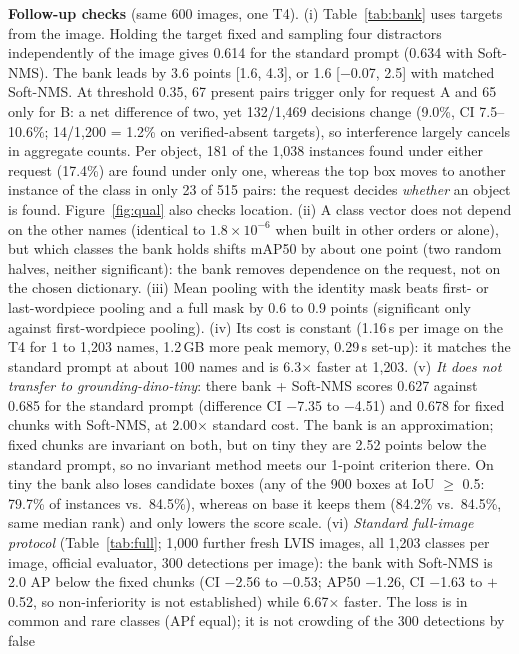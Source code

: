 \documentclass[10pt,twocolumn,letterpaper]{article}
\begin{document}
\textbf{Follow-up checks} (same 600 images, one T4).
(i) Table~\ref{tab:bank} uses targets from the image. Holding the target fixed and sampling four distractors
independently of the image gives 0.614 for the standard prompt (0.634 with Soft-NMS). The bank leads by 3.6 points
[1.6, 4.3], or 1.6 [$-$0.07, 2.5] with matched Soft-NMS. At threshold 0.35, 67 present pairs trigger only for request A
and 65 only for B: a net difference of two, yet 132/1{,}469 decisions change (9.0\%, CI 7.5--10.6\%; 14/1{,}200 = 1.2\%
on verified-absent targets), so interference largely cancels in aggregate counts. Per object, 181 of the 1{,}038
instances found under either request (17.4\%) are found under only one, whereas the top box moves to another instance of
the class in only 23 of 515 pairs: the request decides \emph{whether} an object is found. Figure~\ref{fig:qual} also checks
location. (ii) A class vector does not depend on the other names (identical to $1.8{\times}10^{-6}$ when built in other orders
or alone), but which classes the bank holds shifts mAP50 by about one point (two random halves, neither significant):
the bank removes dependence on the request, not on the chosen dictionary. (iii) Mean pooling with the identity mask
beats first- or last-wordpiece pooling and a full mask by 0.6 to 0.9 points (significant only against first-wordpiece pooling). (iv) Its cost is constant (1.16\,s per
image on the T4 for 1 to 1{,}203 names, 1.2\,GB more peak memory, 0.29\,s set-up): it matches the standard prompt at
about 100 names and is 6.3$\times$ faster at 1{,}203. (v) \emph{It does not transfer to grounding-dino-tiny}: there
bank + Soft-NMS scores 0.627 against 0.685 for the standard prompt (difference CI $-$7.35 to $-$4.51) and 0.678 for
fixed chunks with Soft-NMS, at 2.00$\times$ standard cost. The bank is an approximation;
fixed chunks are invariant on both, but on tiny they are 2.52 points below the standard prompt, so no invariant
method meets our 1-point criterion there. On tiny the bank also loses candidate boxes (any of the 900 boxes at IoU
$\geq$ 0.5: 79.7\% of instances vs.\ 84.5\%), whereas on base it keeps them (84.2\% vs.\ 84.5\%, same median rank) and only
lowers the score scale. (vi) \emph{Standard full-image protocol} (Table~\ref{tab:full}; 1{,}000 further fresh LVIS images,
all 1{,}203 classes per image, official evaluator, 300 detections per image): the bank with Soft-NMS is 2.0 AP below the
fixed chunks (CI $-$2.56 to $-$0.53; AP50 $-$1.26, CI $-$1.63 to $+$0.52, so non-inferiority is not established) while
6.67$\times$ faster. The loss is in common and rare classes (APf equal); it is not crowding of the 300 detections by false
\end{document}
